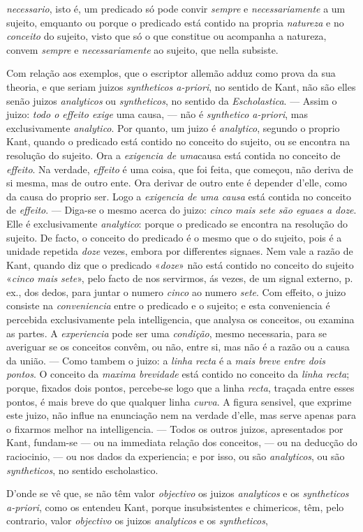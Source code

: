 \emph{necessario}, isto é, um predicado só pode convir \emph{sempre} e \emph{necessariamente} a um sujeito, emquanto ou porque o predicado está contido na propria \emph{natureza} e no \emph{conceito} do sujeito, visto que só o que constitue ou acompanha a natureza, convem \emph{sempre} e \emph{necessariamente} ao sujeito, que nella subsiste.\par Com relação aos exemplos, que o escriptor allemão adduz como prova da sua theoria, e que seriam juizos \emph{syntheticos a-priori}, no sentido de Kant, não são elles senão juizos \emph{analyticos} ou \emph{syntheticos}, no sentido da \emph{Escholastica}. --- Assim o juizo: \emph{todo o effeito exige} uma causa, --- não é \emph{synthetico a-priori}, mas exclusivamente \emph{analytico}. Por quanto, um juizo é \emph{analytico}, segundo o proprio Kant, quando o predicado está contido no conceito do sujeito, ou se encontra na resolução do sujeito. Ora a \emph{exigencia de uma}causa está contida no conceito de \emph{effeito}. Na verdade, \emph{effeito} é uma coisa, que foi feita, que começou, não deriva de si mesma, mas de outro ente. Ora derivar de outro ente é depender d'elle, como da causa do proprio ser. Logo a \emph{exigencia de uma causa} está contida no conceito de \emph{effeito}. --- Diga-se o mesmo acerca do juizo: \emph{cinco mais sete são eguaes a doze}. Elle é exclusivamente \emph{analytico}: porque o predicado se encontra na resolução do sujeito. De facto, o conceito do predicado é o mesmo que o do sujeito, pois é a unidade repetida \emph{doze} vezes, embora por differentes signaes. Nem vale a razão de Kant, quando diz que o predicado «\emph{doze}» não está contido no conceito do sujeito «\emph{cinco mais sete}», pelo facto de nos servirmos, ás vezes, de um signal externo, p. ex., dos dedos, para juntar o numero \emph{cinco} ao numero \emph{sete}. Com effeito, o juizo consiste na \emph{conveniencia} entre o predicado e o sujeito; e esta conveniencia é percebida exclusivamente pela intelligencia, que analysa os conceitos, ou examina as partes. A \emph{experiencia} pode ser uma \emph{condição}, mesmo necessaria, para se averiguar se os conceitos convêm, ou não, entre si, mas não é a razão ou a causa da união. --- Como tambem o juizo: a \emph{linha recta} é a \emph{mais breve entre dois pontos}. O conceito da \emph{maxima brevidade} está contido no conceito da \emph{linha recta}; porque, fixados dois pontos, percebe-se logo que a linha \emph{recta}, traçada entre esses pontos, é mais breve do que qualquer linha \emph{curva}. A figura sensivel, que exprime este juizo, não influe na enunciação nem na verdade d'elle, mas serve apenas para o fixarmos melhor na intelligencia. --- Todos os outros juizos, apresentados por Kant, fundam-se --- ou na immediata relação dos conceitos, --- ou na deducção do raciocinio, --- ou nos dados da experiencia; e por isso, ou são \emph{analyticos}, ou são \emph{syntheticos}, no sentido escholastico.\par D'onde se vê que, se não têm valor \emph{objectivo} os juizos \emph{analyticos} e os \emph{syntheticos a-priori}, como os entendeu Kant, porque insubsistentes e chimericos, têm, pelo contrario, valor \emph{objectivo} os juizos \emph{analyticos} e os \emph{syntheticos}, 